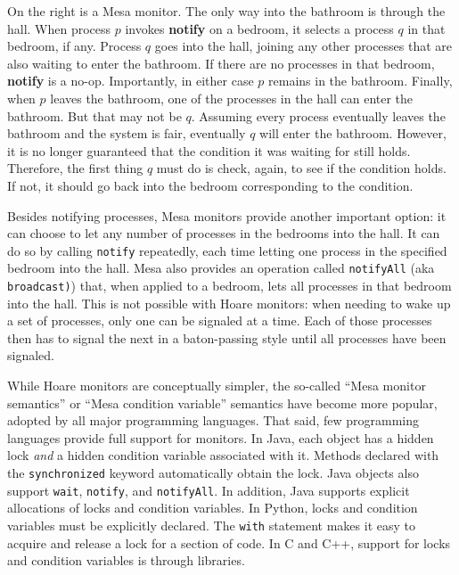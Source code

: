 \documentclass{report}
\begin{document}
On the right is a Mesa monitor.  The only way into the bathroom is through
the hall.  When process $p$ invokes \textbf{notify} on a bedroom, it
selects a process $q$ in that bedroom, if any.
Process $q$ goes into the hall,
joining any other processes that are also waiting to
enter the bathroom.
If there are no processes in that bedroom, \textbf{notify} is a no-op.
Importantly, in either case $p$ remains in the bathroom.
Finally, when $p$ leaves the bathroom, one of the
processes in the hall can enter the bathroom.  But that may not be $q$.
Assuming every process eventually leaves the bathroom and the system is
fair, eventually $q$ will enter the bathroom.  However, it is no longer
guaranteed that the condition it was waiting for still holds.
Therefore, the first thing $q$ must
do is check, again, to see if the condition holds.  If not, it should go back
into the bedroom corresponding to the condition.

Besides notifying processes, Mesa monitors provide another important option:
it can choose to let any number of processes in the bedrooms into the hall.
It can do so by calling
\texttt{notify} repeatedly, each time letting one process in the specified
bedroom into the hall.  Mesa also provides an
operation called \texttt{notifyAll}
%
(aka \texttt{broadcast)})
%
that, when applied to
a bedroom, lets all processes in that bedroom into the hall.
This is not possible with Hoare monitors: when needing to wake up a set
of processes, only one can be signaled at a time.  Each of those processes
then has to signal the next in a baton-passing style
until all processes have been signaled.

While Hoare monitors are conceptually simpler, the so-called
``Mesa monitor semantics'' or ``Mesa condition variable'' semantics
have become more popular, adopted by all major
programming languages.
That said, few programming languages provide full support for monitors.
In Java, each object has a hidden lock \emph{and} a hidden condition variable
associated with it.
Methods declared with the \texttt{synchronized} keyword automatically
obtain the lock.  Java objects also support \texttt{wait}, \texttt{notify},
and \texttt{notifyAll}.
In addition, Java supports explicit allocations of locks
and condition variables.
In Python, locks and condition variables must be explicitly declared.
The \texttt{with} statement makes it easy to acquire and release a lock
for a section of code.
In C and C++, support for locks and condition variables is through libraries.
\end{document}
